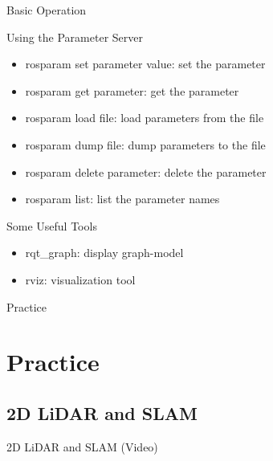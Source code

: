 \documentclass[10pt]{beamer}
\begin{document}
\begin{frame}[allowframebreaks]{Basic Operation}
  \begin{block}{Using the Parameter Server}
   \begin{itemize}
    \item rosparam set parameter value: set the parameter
    \item rosparam get parameter: get the parameter
    \item rosparam load file: load parameters from the file
    \item rosparam dump file: dump parameters to the file
    \item rosparam delete parameter: delete the parameter
    \item rosparam list: list the parameter names
   \end{itemize}
  \end{block}
  \begin{block}{Some Useful Tools}
   \begin{itemize}
    \item rqt\_graph: display graph-model
    \item rviz: visualization tool
   \end{itemize}
  \end{block}
 \end{frame}

    \begin{frame}{}
  \begin{center}
   \LARGE Practice
  \end{center}
 \end{frame}
 
 \section{Practice}
 
 \subsection{2D LiDAR and SLAM}
 
  \begin{frame}{2D LiDAR and SLAM (Video)}
 \end{frame}
 
\end{document}
